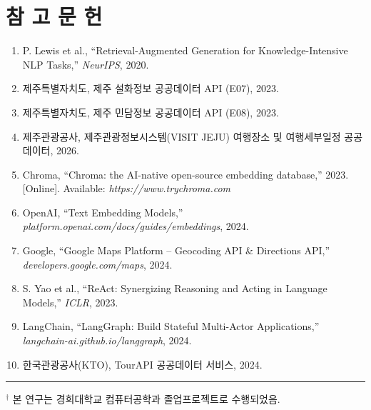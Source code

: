 \documentclass[10pt,twocolumn,a4paper]{article}
\begin{document}
\section*{참 고 문 헌}

\begin{small}
\begin{enumerate}
\setlength{\itemsep}{1pt}
\item P. Lewis et al., ``Retrieval-Augmented Generation for
  Knowledge-Intensive NLP Tasks,'' \textit{NeurIPS}, 2020.
\item 제주특별자치도, 제주 설화정보 공공데이터 API (E07), 2023.
\item 제주특별자치도, 제주 민담정보 공공데이터 API (E08), 2023.
\item 제주관광공사, 제주관광정보시스템(VISIT JEJU) 여행장소 및
  여행세부일정 공공데이터, 2026.
\item Chroma, ``Chroma: the AI-native open-source embedding database,''
  2023. [Online]. Available: \textit{https://www.trychroma.com}
\item OpenAI, ``Text Embedding Models,''
  \textit{platform.openai.com/docs/guides/embeddings}, 2024.
\item Google, ``Google Maps Platform -- Geocoding API \& Directions
  API,'' \textit{developers.google.com/maps}, 2024.
\item S. Yao et al., ``ReAct: Synergizing Reasoning and Acting in
  Language Models,'' \textit{ICLR}, 2023.
\item LangChain, ``LangGraph: Build Stateful Multi-Actor
  Applications,'' \textit{langchain-ai.github.io/langgraph}, 2024.
\item 한국관광공사(KTO), TourAPI 공공데이터 서비스, 2024.
\end{enumerate}
\end{small}

\vspace{6pt}
\noindent\rule{\columnwidth}{0.4pt}
\vspace{4pt}
{\footnotesize $^\dagger$ 본 연구는 경희대학교 컴퓨터공학과 졸업프로젝트로 수행되었음.}
\end{document}

